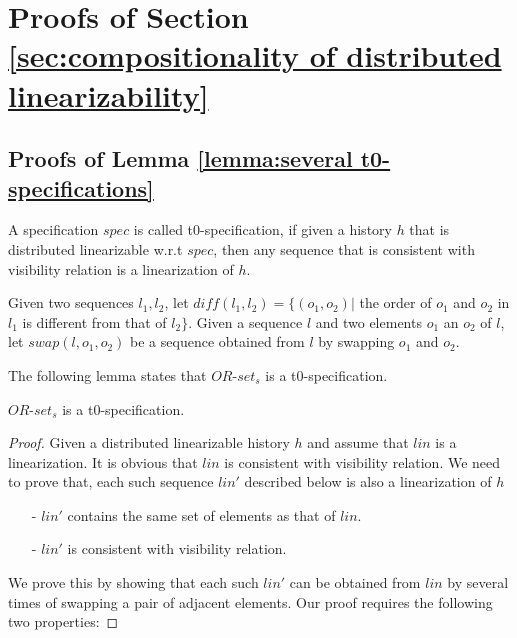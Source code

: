 \forget
{
\section{Proofs of Section \ref{sec:compositionality of distributed linearizability}}
\label{sec:appendix proofs of section compositionality of distributed linearizability}



\subsection{Proofs of Lemma \ref{lemma:several t0-specifications}}
\label{subsec:appendix proofs of Lemma several t0-specifications}

A specification $\mathit{spec}$ is called t0-specification, if given a history $h$ that is distributed linearizable w.r.t $\mathit{spec}$, then any sequence that is consistent with visibility relation is a linearization of $h$.

Given two sequences $l_1,l_2$, let $\mathit{diff}(l_1,l_2) = \{ (o_1,o_2) \vert$ the order of $o_1$ and $o_2$ in $l_1$ is different from that of $l_2 \}$. Given a sequence $l$ and two elements $o_1$ an $o_2$ of $l$, let $\mathit{swap}(l,o_1,o_2)$ be a sequence obtained from $l$ by swapping $o_1$ and $o_2$.

The following lemma states that $\mathit{OR}$-$\mathit{set}_s$ is a t0-specification.

\begin{lemma}
\label{lemma:or-set is a t0-specification}
$\mathit{OR}$-$\mathit{set}_s$ is a t0-specification.
\end{lemma}

\begin {proof}
Given a distributed linearizable history $h$ and assume that $\mathit{lin}$ is a linearization. It is obvious that $\mathit{lin}$ is consistent with visibility relation. We need to prove that, each such sequence $\mathit{lin}'$ described below is also a linearization of $h$

\begin{itemize}
\setlength{\itemsep}{0.5pt}
\item[-] $\mathit{lin}'$ contains the same set of elements as that of $\mathit{lin}$.

\item[-] $\mathit{lin}'$ is consistent with visibility relation.
\end{itemize}

We prove this by showing that each such $\mathit{lin}'$ can be obtained from $\mathit{lin}$ by several times of swapping a pair of adjacent elements. Our proof requires the following two properties:


\end{proof}}
